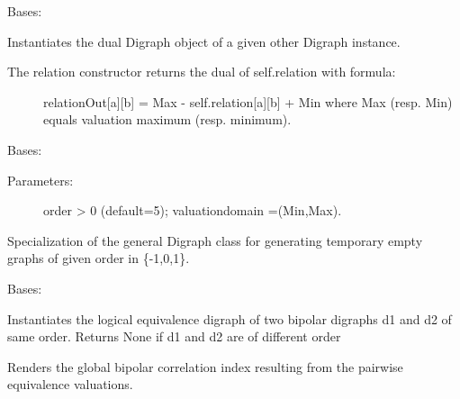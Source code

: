 \documentclass[letterpaper,10pt,english]{sphinxmanual}
\begin{document}

\begin{fulllineitems}
\label{techDoc:digraphs.DualDigraph}
Bases: {\hyperref[techDoc:digraphs.Digraph]{\emph{}}}

Instantiates the dual Digraph object of a given other Digraph instance.
\begin{description}
\item[{The relation constructor returns the dual of self.relation with formula:}] \leavevmode
relationOut{[}a{]}{[}b{]} = Max - self.relation{[}a{]}{[}b{]} + Min
where Max (resp. Min) equals valuation maximum (resp. minimum).

\end{description}

\end{fulllineitems}


\begin{fulllineitems}
\label{techDoc:digraphs.EmptyDigraph}
Bases: {\hyperref[techDoc:digraphs.Digraph]{\emph{}}}
\begin{description}
\item[{Parameters:}] \leavevmode
order \textgreater{} 0 (default=5); valuationdomain =(Min,Max).

\end{description}

Specialization of the general Digraph class for generating
temporary empty graphs of given order in \{-1,0,1\}.

\end{fulllineitems}


\begin{fulllineitems}
\label{techDoc:digraphs.EquivalenceDigraph}
Bases: {\hyperref[techDoc:digraphs.Digraph]{\emph{}}}

Instantiates the logical equivalence digraph of two bipolar
digraphs d1 and d2 of same order. Returns None if d1 and d2 are of different order

\begin{fulllineitems}
\label{techDoc:digraphs.EquivalenceDigraph.computeCorrelation}
Renders the global bipolar correlation index resulting from the pairwise
equivalence valuations.

\end{fulllineitems}


\end{fulllineitems}
\end{document}
